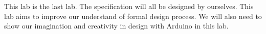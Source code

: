 This lab is the last lab. The specification will all be designed by ourselves. This lab aims to improve our understand of formal design process. We will also need to show our imagination and creativity in design with Arduino in this lab.